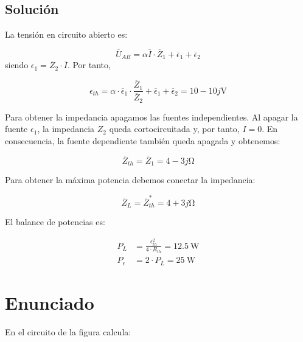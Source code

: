 \subsection*{Solución}

La tensión en circuito abierto es:

\begin{equation*}
  \overline{U}_{AB} = \alpha \overline{I} \cdot \overline{Z}_1 + \overline{\epsilon}_1 + \overline{\epsilon}_2
\end{equation*}
siendo $\epsilon_1 = \overline{Z}_2 \cdot \overline{I}$. Por tanto,

\begin{equation*}
  \epsilon_{th}  = \alpha \cdot \overline{\epsilon}_1 \cdot \frac{\overline{Z}_1}{\overline{Z}_2} + \overline{\epsilon}_1 + \overline{\epsilon}_2 = 10 - 10j \si{\volt}
\end{equation*}

Para obtener la impedancia apagamos las fuentes independientes. Al apagar la fuente $\epsilon_1$, la impedancia $Z_2$ queda cortocircuitada y, por tanto, $I = 0$. En consecuencia, la fuente dependiente también queda apagada y obtenemos:

\begin{equation*}
  \overline{Z}_{th} = \overline{Z}_1 = 4 - 3j \si{\ohm}
\end{equation*}

Para obtener la máxima potencia debemos conectar la impedancia:

\begin{equation*}
  \overline{Z}_{L} = \overline{Z}^*_{th} = 4 + 3j \si{\ohm}
\end{equation*}

El balance de potencias es:

\begin{align*}
  P_L &= \frac{\epsilon_{th}^2}{4 \cdot R_{th}} = \SI{12.5}{\watt}\\
  P_{\epsilon} &= 2 \cdot P_L = \SI{25}{\watt} 
\end{align*}
\section{Enunciado}

En el circuito de la figura calcula:

